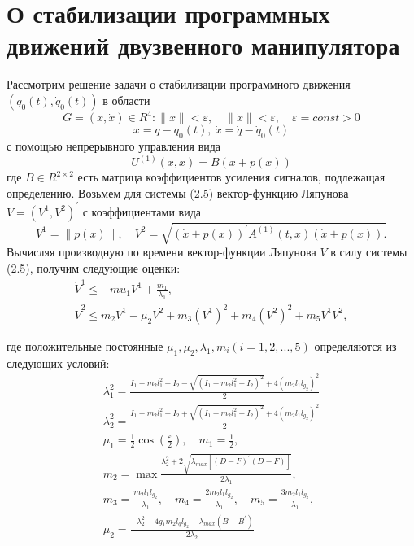 \section{О стабилизации программных движений двузвенного манипулятора} \label{p23}
Рассмотрим решение задачи о стабилизации программного движения $(q_0 (t), \dot q_0 (t))$ в области 
$$G = {(x, \dot x) \in R^4 : \|x\|<\varepsilon, \quad \|\dot x\|<\varepsilon, \quad \varepsilon=const>0}$$
$$x = q - q_0 (t), \ \dot x = \dot q - \dot q_0 (t)$$
с помощью непрерывного управления вида
\begin{equation}
U^{(1)}(x, \dot x) = B(\dot x + p(x))
\end{equation}    
где $B \in R^{2 \times 2}$ есть матрица коэффициентов усиления сигналов, подлежащая определению.
Возьмем для системы (2.5) вектор-функцию Ляпунова $V = (V^1, V^2)^{'}$  с коэффициентами вида $$V^1 = \|p(x)\|, \quad V^2 = \sqrt{(\dot x + p(x))^{'} A^{(1)}(t, x)(\dot x + p(x)).}$$
Вычисляя производную по времени вектор-функции Ляпунова $V$ в силу системы (2.5), получим следующие оценки:
\begin{equation}
\begin{array}{l}
\dot V^1 \le -mu_1 V^1 + \frac{m_1}{\lambda_1},\\
\dot V^2 \le m_2 V^1 - \mu_2 V^2 + m_3 (V^1)^2 + m_4 (V^2)^2 + m_5 V^1 V^2, 
\end{array}
\end{equation}

где положительные постоянные $\mu_1, \mu_2, \lambda_1, m_i (i=1,2,...,5)$ определяются из следующих условий:
$$
\begin{array}{l}
\displaystyle \lambda_1^2 = \frac{I_1 + m_2 l_1^2 + I_2 - \sqrt{(I_1 + m_2 l_1^2 - I_2)^2} + 4(m_2 l_1 l_{g_2})^2}{2}\\
\displaystyle \lambda_2^2 = \frac{I_1 + m_2 l_1^2 + I_2 + \sqrt{(I_1 + m_2 l_1^2 - I_2)^2} + 4(m_2 l_1 l_{g_2})^2}{2}\\
\displaystyle \mu_1 =\frac12 \cos(\frac{\varepsilon}{2}), \quad m_1 = \frac12,\\
\displaystyle m_2 = \max \frac{\lambda_2^2 + 2 \sqrt{\lambda_{max} [(D-F)^{'} (D-F)]}}{2 \lambda_1},\\
\displaystyle m_3 = \frac{m_2 l_1 l_{g_2}}{\lambda_1}, \quad m_4 = \frac{2 m_2 l_1 l_{g_2}}{\lambda_1}, \quad m_5 = \frac{3 m_2 l_1 l_{g_2}}{\lambda_1},\\
\displaystyle \mu_2 = \frac{-\lambda_2^2 - 4 g_1 m_2 l_q l_{g_2} - \lambda_{max} (B + B^{'})}{2 \lambda_2}
\end{array}
$$

